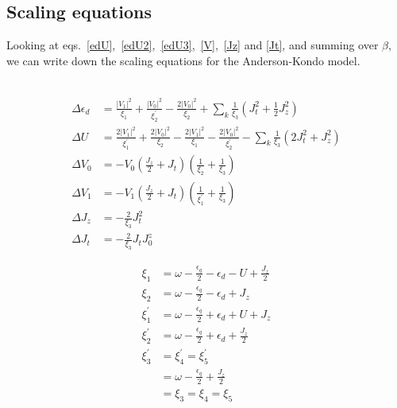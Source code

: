 \documentclass[twoside,11pt]{report}
\numberwithin{equation}{section}
\begin{document}
\subsection{Scaling equations}
Looking at eqs.~\ref{edU},~\ref{edU2},~\ref{edU3},~\ref{V},~\ref{Jz} and \ref{Jt}, and summing over \(\beta\), we can write down the scaling equations for the Anderson-Kondo model.
\\\\\begin{minipage}{320pt}
\begin{equation}\begin{aligned}
	\Delta \epsilon_d &= \frac{|V_1|^2}{\xi_1} + \frac{|V_0|^2}{\xi_2^\prime} - \frac{2|V_0|^2}{\xi_2} + \sum_k \frac{1}{\xi_3}\left(J_t^2  + \frac{1}{2}J_z^2\right)\\
	\Delta U &= \frac{2|V_1|^2}{\xi_1^\prime} + \frac{2|V_0|^2}{\xi_2} - \frac{2|V_1|^2}{\xi_1} - \frac{2|V_0|^2}{\xi_2^\prime} - \sum_k \frac{1}{\xi_3}\left(2J_t^2 + J_z^2\right)\\
	\Delta V_0 &= -V_0\left(\frac{J_z}{2} + J_t \right) \left(\frac{1}{\xi_2} + \frac{1}{\xi_3}\right)\\
	\Delta V_1 &= -V_1\left(\frac{J_z}{2} + J_t \right) \left(\frac{1}{\xi^\prime_1} + \frac{1}{\xi_3}\right)\\
	\Delta J_z &= -\frac{2}{\xi_3}J_t^2\\
	\Delta J_t &= -\frac{2}{\xi_3}J_t J^z_0
\end{aligned}\end{equation}
\end{minipage}
\vline
\begin{minipage}{150pt}
\begin{equation*}\begin{aligned}
	\xi_1 &= \omega - \frac{\epsilon_q}{2} - \epsilon_d - U + \frac{J_z}{2}\\
	\xi_2 &= \omega - \frac{\epsilon_q}{2} - \epsilon_d + J_z\\
	\xi_1^\prime &= \omega - \frac{\epsilon_q}{2} + \epsilon_d + U + J_z\\
	\xi_2^\prime &= \omega - \frac{\epsilon_q}{2} + \epsilon_d + \frac{J_z}{2}\\
	\xi_3^\prime &= \xi_4^\prime = \xi_5^\prime \\
		     &= \omega - \frac{\epsilon_q}{2} + \frac{J_z}{2}\\
		     &= \xi_3 = \xi_4 = \xi_5\\
\end{aligned}\end{equation*}
\end{minipage}
\end{document}
